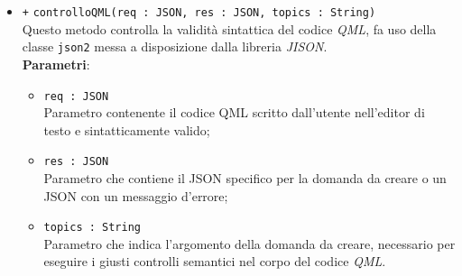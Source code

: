 \begin{itemize}
	\begin{itemize}
		\item \texttt{+} \texttt{controlloQML(req : JSON, res : JSON, topics : String)} \\ 
		Questo metodo controlla la validità sintattica del codice \textit{QML}, fa uso della classe \texttt{json2} messa a disposizione dalla libreria \textit{JISON}. \\
		\textbf{Parametri}:
		\begin{itemize}
			\item \texttt{req : JSON} \\
			Parametro contenente il codice QML scritto dall'utente nell'editor di testo e sintatticamente valido;
			\item \texttt{res : JSON} \\
			Parametro che contiene il JSON specifico per la domanda da creare o un JSON con un messaggio d'errore;
			\item \texttt{topics : String} \\
			Parametro che indica l'argomento della domanda da creare, necessario per eseguire i giusti controlli semantici nel corpo del codice \textit{QML}.
		\end{itemize}
	\end{itemize}
\end{itemize}

